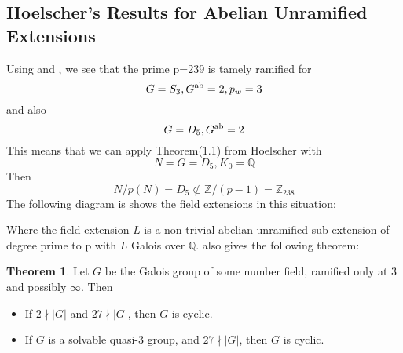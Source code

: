 \documentclass[12pt]{extarticle}
\newcommand{\Q}{\mathbb{Q}}
\newcommand{\Z}{\mathbb{Z}}
\newcommand{\<}{\langle}
\renewcommand{\>}{\rangle}
\theoremstyle{definition}
\newtheorem{theorem}{Theorem}
\begin{document}
\subsection{Hoelscher's Results for Abelian Unramified Extensions}
Using \cite{HOEL} and \cite{JONE}, we see that 
the prime p=239 is tamely ramified for 
\begin{equation}
  G=S_3,G\textsuperscript{ab} = 2, p_w =3  
\end{equation} and also 
\begin{equation}
    G=D_5,G\textsuperscript{ab} = 2 
\end{equation}
This means that we can apply Theorem(1.1) from Hoelscher \cite{HOEL} with
\begin{equation}
    N = G = D_5, K_0 = \Q
\end{equation}
Then 
\begin{equation}
N/p(N) = D_5 \not\subset \Z/(p-1) = \Z_{238}
\end{equation}
The following diagram is shows the field extensions in this situation: 
\begin{center}
    
\end{center}
\par
Where the field extension $L$ is a non-trivial abelian unramified sub-extension of degree prime to p with $L$ Galois over $\mathbb{Q}$.
\cite{HOEL} also gives the following theorem: 
\begin{theorem}
Let $G$ be the Galois group of some number field, ramified only at 3 and possibly $\infty$. Then \begin{itemize}
\item If $2 \nmid |G|$ and $ 27 \nmid |G|$, then $G$ is cyclic.
\item If $G$ is a solvable quasi-3 group, and $ 27 \nmid |G|$, then $G$ is cyclic.
\end{itemize}
\end{theorem}
\end{document}
